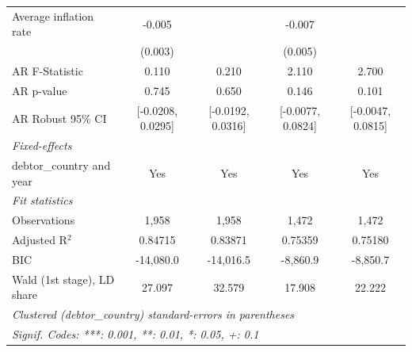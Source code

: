 \begin{table}[htbp]
\begin{tabular}{lcccc}
      Average inflation rate     & -0.005            &                   & -0.007            &   \\   
                                 & (0.003)           &                   & (0.005)           &   \\   
      AR F-Statistic             & 0.110             & 0.210             & 2.110             & 2.700\\  
      AR p-value                 & 0.745             & 0.650             & 0.146             & 0.101\\  
      AR Robust 95\% CI          & [-0.0208, 0.0295] & [-0.0192, 0.0316] & [-0.0077, 0.0824] & [-0.0047, 0.0815]\\  
      \midrule
      \emph{Fixed-effects}\\
      debtor\_country and year   & Yes               & Yes               & Yes               & Yes\\  
      \midrule
      \emph{Fit statistics}\\
      Observations               & 1,958             & 1,958             & 1,472             & 1,472\\  
      Adjusted R$^2$             & 0.84715           & 0.83871           & 0.75359           & 0.75180\\  
      BIC                        & -14,080.0         & -14,016.5         & -8,860.9          & -8,850.7\\  
      Wald (1st stage), LD share & 27.097            & 32.579            & 17.908            & 22.222\\  
      \midrule \midrule
      \multicolumn{5}{l}{\emph{Clustered (debtor\_country) standard-errors in parentheses}}\\
      \multicolumn{5}{l}{\emph{Signif. Codes: ***: 0.001, **: 0.01, *: 0.05, +: 0.1}}\\
   \end{tabular}
\end{table}


